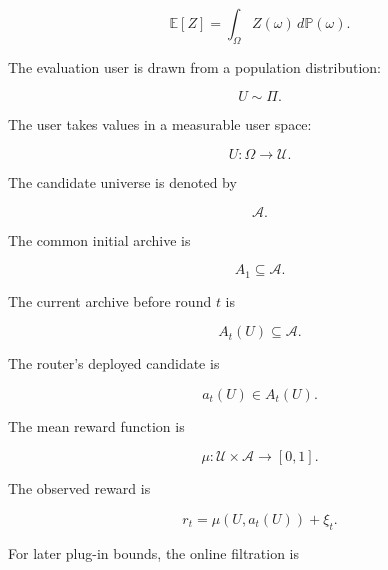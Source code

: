 \documentclass{article} %
\begin{document}
\begin{equation}
\label{eq:app-expectation}
\mathbb{E}[Z]
=
\int_{\Omega} Z(\omega)\,d\mathbb{P}(\omega).
\end{equation}

The evaluation user is drawn from a population distribution:

\begin{equation}
\label{eq:app-user-draw}
U \sim \Pi.
\end{equation}

The user takes values in a measurable user space:

\begin{equation}
\label{eq:app-user-space}
U:\Omega \to \mathcal{U}.
\end{equation}

The candidate universe is denoted by

\begin{equation}
\label{eq:app-candidate-universe}
\mathcal{A}.
\end{equation}

The common initial archive is

\begin{equation}
\label{eq:app-initial-archive}
A_1 \subseteq \mathcal{A}.
\end{equation}

The current archive before round \(t\) is

\begin{equation}
\label{eq:app-current-archive}
A_t(U) \subseteq \mathcal{A}.
\end{equation}

The router's deployed candidate is

\begin{equation}
\label{eq:app-action}
a_t(U) \in A_t(U).
\end{equation}

The mean reward function is

\begin{equation}
\label{eq:app-mean-reward}
\mu:\mathcal{U}\times\mathcal{A}\to[0,1].
\end{equation}

The observed reward is

\begin{equation}
\label{eq:app-observed-reward}
r_t
=
\mu(U,a_t(U))+\xi_t.
\end{equation}

For later plug-in bounds, the online filtration is
\end{document}
